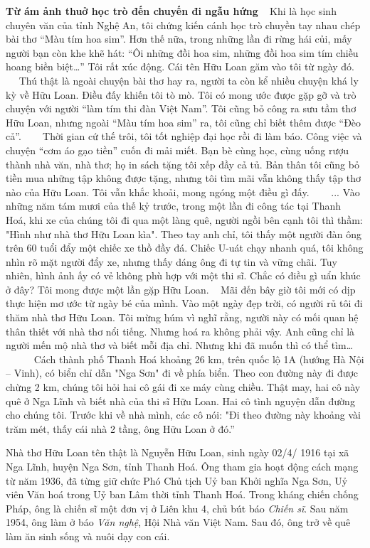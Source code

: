 \documentclass[../main.tex]{subfiles}
\begin{document}
\begin{multicols}{2}
\textbf{Từ ám ảnh thuở học trò đến chuyến đi ngẫu hứng} 
  
Khi là học sinh chuyên văn của tỉnh Nghệ An, tôi chứng kiến cánh học trò chuyền tay nhau chép bài thơ “Màu tím hoa sim”. Hơn thế nữa, trong những lần đi rừng hái củi, mấy người bạn còn khe khẽ hát: “Ôi những đồi hoa sim, những đồi hoa sim tím chiều hoang biền biệt…” Tôi rất xúc động. Cái tên Hữu Loan găm vào tôi từ ngày đó.  
    
Thú thật là ngoài chuyện bài thơ hay ra, người ta còn kể nhiều chuyện khá ly kỳ về Hữu Loan. Điều đấy khiến tôi tò mò. Tôi có mong ước được gặp gỡ và trò chuyện với người “làm tím thi đàn Việt Nam”. Tôi cũng bỏ công ra sưu tầm thơ Hữu Loan, nhưng ngoài “Màu tím hoa sim” ra, tôi cũng chỉ biết thêm được “Đèo cả”. 
     
Thời gian cứ thế trôi, tôi tốt nghiệp đại học rồi đi làm báo. Công việc và chuyện “cơm áo gạo tiền” cuốn đi mải miết. Bạn bè cùng học, cùng uống rượu thành nhà văn, nhà thơ; họ in sách tặng tôi xếp đầy cả tủ. Bản thân tôi cũng bỏ tiền mua những tập không được tặng, nhưng tôi tìm mãi vẫn không thấy tập thơ nào của Hữu Loan. Tôi vẫn khắc khoải, mong ngóng một điều gì đấy. 
\textbf{   } 
... Vào những năm tám mươi của thế kỷ trước, trong một lần đi công tác tại Thanh Hoá, khi xe của chúng tôi đi qua một làng quê, người ngồi bên cạnh tôi thì thầm: "Hình như nhà thơ Hữu Loan kìa". Theo tay anh chỉ, tôi thấy một người đàn ông trên 60 tuổi đẩy một chiếc xe thồ đầy đá. Chiếc U-uát chạy nhanh quá, tôi không nhìn rõ mặt người đẩy xe, nhưng thấy dáng ông đi tự tin và vững chãi. Tuy nhiên, hình ảnh ấy có vẻ không phù hợp với một thi sĩ. Chắc có điều gì uẩn khúc ở đây? Tôi mong được một lần gặp Hữu Loan. 
    
Mãi đến bây giờ tôi mới có dịp thực hiện mơ ước từ ngày bé của mình. Vào một ngày đẹp trời, có người rủ tôi đi thăm nhà thơ Hữu Loan. Tôi mừng húm vì nghĩ rằng, người này có mối quan hệ thân thiết với nhà thơ nổi tiếng. Nhưng hoá ra không phải vậy. Anh cũng chỉ là người mến mộ nhà thơ và biết mỗi địa chỉ. Nhưng khi đã muốn thì có thể tìm… 
       
Cách thành phố Thanh Hoá khoảng 26 km, trên quốc lộ 1A (hướng Hà Nội – Vinh), có biển chỉ dẫn "Nga Sơn" đi về phía biển. Theo con đường này đi được chừng 2 km, chúng tôi hỏi hai cô gái đi xe máy cùng chiều. Thật may, hai cô này quê ở Nga Lĩnh và biết nhà của thi sĩ Hữu Loan. Hai cô tình nguyện dẫn đường cho chúng tôi. Trước khi về nhà mình, các cô nói: "Đi theo đường này khoảng vài trăm mét, thấy cái nhà 2 tầng, ông Hữu Loan ở đó.” 
 \begin{blockquote}
Nhà thơ Hữu Loan tên thật là Nguyễn Hữu Loan, sinh ngày 02/4/ 1916 tại xã Nga Lĩnh, huyện Nga Sơn, tỉnh Thanh Hoá. Ông tham gia hoạt động cách mạng từ năm 1936, đã từng giữ chức Phó Chủ tịch Uỷ ban Khởi nghĩa Nga Sơn, Uỷ viên Văn hoá trong Uỷ ban Lâm thời tỉnh Thanh Hoá. Trong kháng chiến chống Pháp, ông là chiến sĩ một đơn vị ở Liên khu 4, chủ bút báo \textit{Chiến sĩ}. Sau năm 1954, ông làm ở báo \textit{Văn nghệ}, Hội Nhà văn Việt Nam. Sau đó, ông trở về quê làm ăn sinh sống và nuôi dạy con cái. \end{blockquote}

\end{multicols}
\end{document}
